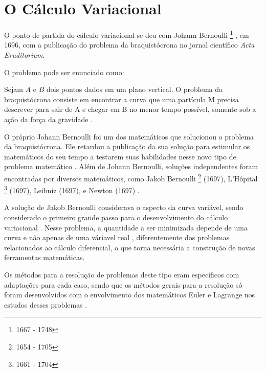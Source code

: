 \documentclass[
	12pt,				%
	openright,			%
    twoside,			%
	a4paper,			%
	english,			%
	french,				%
	spanish,			%
	brazil				%
	]{abntex2}
\numberwithin{lema}{chapter}
\numberwithin{teorema}{chapter}
\numberwithin{definicao}{chapter}
\numberwithin{exemplo}{chapter}
\numberwithin{figure}{chapter}
\newcommand{\bdDate}[2]{
	\footnote{\gtrsymBorn\text{ }#1 - \gtrsymDied\text{ }#2}
}
\begin{document}
\section{O Cálculo Variacional}


O ponto de partida do cálculo variacional se deu com Johann Bernoulli\bdDate{1667}{1748}, em 1696, com a publicação do problema da braquistócrona no jornal científico \textit{Acta Eruditorium}. \cite{hist_courant}

O problema pode ser enunciado como:
\begin{citacao}
Sejam $A$ e $B$ dois pontos dados em um plano vertical. O problema da braquistócrona consiste em encontrar a curva que uma partícula M precisa descrever para sair de A e chegar em B no menor tempo possível, somente sob a ação da força da gravidade \cite[p. 3]{calcvar}.
\end{citacao}

O próprio Johann Bernoulli foi um dos matemáticos que solucionou o problema da braquistócrona. Ele retardou a publicação da sua solução para estimular os matemáticos do seu tempo a testarem suas habilidades nesse novo tipo de problema matemático \cite{hist_courant}. Além de Johann Bernoulli, soluções independentes foram encontradas por diversos matemáticos, como Jakob Bernoulli\bdDate{1654}{1705} (1697), L'Hôpital\bdDate{1661}{1704} (1697), Leibniz (1697), e Newton (1697) \cite{hist_still}.

A solução de Jakob Bernoulli considerava o aspecto da curva variável, sendo considerado o primeiro grande passo para o desenvolvimento do cálculo variacional \cite{hist_still}. Nesse problema, a quantidade a ser minimizada depende de uma curva e não apenas de uma váriavel real \cite{hist_courant}, diferentemente dos problemas relacionados ao cálculo diferencial, o que torna necessária a construção de novas ferramentas matemáticas. 

Os métodos para a resolução de problemas deste tipo eram específicos com adaptações para cada caso, sendo que os métodos gerais para a resolução só foram desenvolvidos com o envolvimento dos matemáticos Euler e Lagrange nos estudos desses problemas \cite{hist_courant}.
\end{document}

